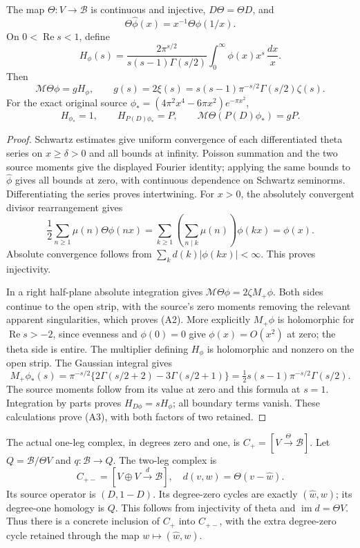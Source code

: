 \begin{proposition}
The map \(\Theta:V\to\mathscr B\) is continuous and injective,
\(D\Theta=\Theta D\), and
\[
 \Theta\widehat\phi(x)=x^{-1}\Theta\phi(1/x).
\]
On \(0<\operatorname{Re}s<1\), define
\[
 H_\phi(s)=\frac{2\pi^{s/2}}
             {s(s-1)\Gamma(s/2)}\int_0^\infty\phi(x)x^s\,\frac{dx}{x}.
\]
Then
\[
 \mathcal M\Theta\phi=gH_\phi,\qquad
 g(s)=2\xi(s)=s(s-1)\pi^{-s/2}\Gamma(s/2)\zeta(s).
 \tag{A2}
\]
For the exact original source
\(\phi_*=(4\pi^2x^4-6\pi x^2)e^{-\pi x^2}\),
\[
 H_{\phi_*}=1,\qquad
 H_{P(D)\phi_*}=P,\qquad
 \mathcal M\Theta(P(D)\phi_*)=gP .
 \tag{A3}
\]
\end{proposition}
\begin{proof}
Schwartz estimates give uniform convergence of each differentiated
theta series on \(x\geq\delta>0\) and all bounds at infinity.
Poisson summation and the two source moments give the displayed
Fourier identity; applying the same bounds to \(\widehat\phi\)
gives all bounds at zero, with continuous dependence on Schwartz
seminorms. Differentiating the series proves intertwining.
For \(x>0\), the absolutely convergent divisor rearrangement gives
\[
 \frac12\sum_{n\geq1}\mu(n)\Theta\phi(nx)
   =\sum_{k\geq1}\left(\sum_{n\mid k}\mu(n)\right)\phi(kx)=\phi(x).
\]
Absolute convergence follows from
\(\sum_k d(k)|\phi(kx)|<\infty\).
This proves injectivity.

In a right half-plane absolute integration gives
\(\mathcal M\Theta\phi=2\zeta M_+\phi\).
Both sides continue to the open strip, with the source's zero
moments removing the relevant apparent singularities, which
proves (A2). More explicitly \(M_+\phi\) is holomorphic for
\(\operatorname{Re}s>-2\), since evenness and \(\phi(0)=0\)
give \(\phi(x)=O(x^2)\) at zero; the theta side is entire.
The multiplier defining \(H_\phi\) is holomorphic and nonzero
on the open strip. The Gaussian integral gives
\[
 M_+\phi_*(s)
 =\pi^{-s/2}\{2\Gamma(s/2+2)-3\Gamma(s/2+1)\}
 =\tfrac12s(s-1)\pi^{-s/2}\Gamma(s/2).
\]
The source moments follow from its value at zero and this formula
at \(s=1\). Integration by parts proves
\(H_{D\phi}=sH_\phi\); all boundary terms vanish.
These calculations prove (A3), with both factors of two retained.
\end{proof}

The actual one-leg complex, in degrees zero and one, is
\(C_+=[V\xrightarrow{\Theta}\mathscr B]\).
Let \(Q=\mathscr B/\Theta V\) and \(q:\mathscr B\to Q\).
The two-leg complex is
\[
 C_{+-}=[V\oplus V\xrightarrow{d}\mathscr B],\quad
       d(v,w)=\Theta(v-\widehat w).
 \tag{A4}
\]
Its source operator is \((D,1-D)\).
Its degree-zero cycles are exactly \((\widehat w,w)\);
its degree-one homology is \(Q\). This follows from injectivity
of theta and \(\operatorname{im}d=\Theta V\).
Thus there is a concrete inclusion of \(C_+\) into \(C_{+-}\),
with the extra degree-zero cycle retained through the map
\(w\mapsto(\widehat w,w)\).

